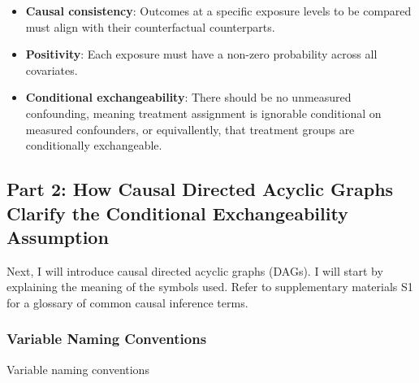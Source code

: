 \documentclass[
  single column]{article}
\providecommand{\tightlist}{%
  \setlength{\itemsep}{0pt}\setlength{\parskip}{0pt}}\usepackage{longtable,booktabs,array}
\begin{document}
\begin{itemize}
\tightlist
\item
  \textbf{Causal consistency}: Outcomes at a specific exposure levels to
  be compared must align with their counterfactual counterparts.
\item
  \textbf{Positivity}: Each exposure must have a non-zero probability
  across all covariates.
\item
  \textbf{Conditional exchangeability}: There should be no unmeasured
  confounding, meaning treatment assignment is ignorable conditional on
  measured confounders, or equivallently, that treatment groups are
  conditionally exchangeable.
\end{itemize}

\newpage{}

\subsection{Part 2: How Causal Directed Acyclic Graphs Clarify the
Conditional Exchangeability Assumption}\label{id-sec-2}

Next, I will introduce causal directed acyclic graphs (DAGs). I will
start by explaining the meaning of the symbols used. Refer to
supplementary materials S1 for a glossary of common causal inference
terms.

\subsubsection{Variable Naming
Conventions}\label{variable-naming-conventions}

\begin{table}

\caption{\label{tbl-terminology}Variable naming conventions}

\centering{

\terminologylocalconventionssimple

}

\end{table}%
\end{document}
